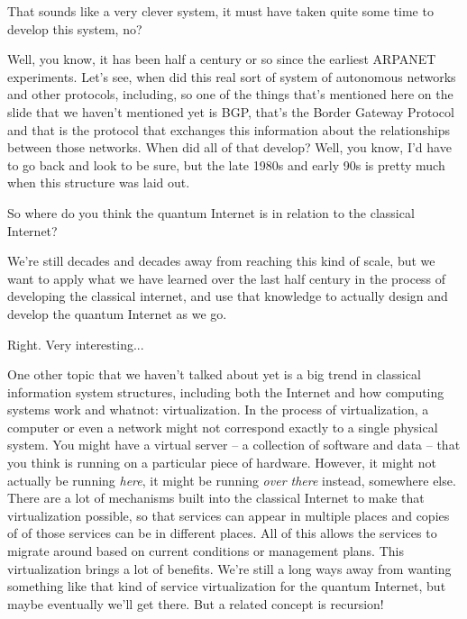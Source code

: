 \mmm That sounds like a very clever system, it must have taken quite some time to develop this system, no?

\rrr Well, you know, it has been half a century or so since the earliest ARPANET experiments.  Let's see, when did this real sort of system of autonomous networks and other protocols, including, so one of the things that's mentioned here on the slide that we haven't mentioned yet is BGP, that's the Border Gateway Protocol and that is the protocol that exchanges this information about the relationships between those networks. When did all of that develop? Well, you know, I'd have to go back and look to be sure, but the late 1980s and early 90s is pretty much when this structure was laid out.

\mmm So where do you think the quantum Internet is in relation to the classical Internet?

\rrr We're still decades and decades away from reaching this kind of scale, but we want to apply what we have learned over the last half century in the process of developing the classical internet, and use that knowledge to actually design and develop the quantum Internet as we go.

\mmm Right. Very interesting...

\rrr One other topic that we haven't talked about yet is a big trend in classical information system structures, including both the Internet and how computing systems work and whatnot: virtualization. In the process of virtualization, a computer or even a network might not correspond exactly to a single physical system. You might have a virtual server -- a collection of software and data -- that you think is running on a particular piece of hardware.  However, it might not actually be running \emph{here}, it might be running \emph{over there} instead, somewhere else. There are a lot of mechanisms built into the classical Internet to make that virtualization possible, so that services can appear in multiple places and copies of of those services can be in different places. All of this allows the services to migrate around based on current conditions or management plans. This virtualization brings a lot of benefits. We're still a long ways away from wanting something like that kind of service virtualization for the quantum Internet, but maybe eventually we'll get there. But a related concept is recursion!


